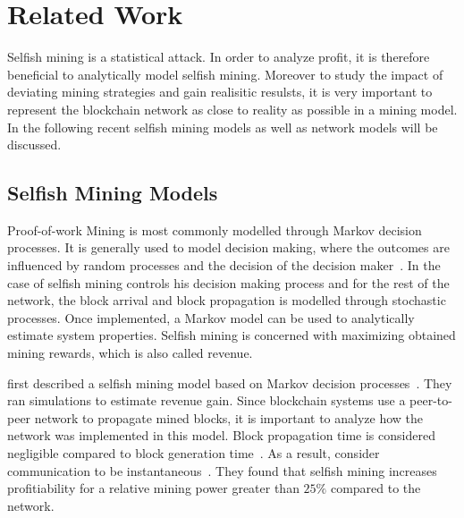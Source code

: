 \chapter{Related Work}\label{chap:relatedwork}
Selfish mining is a statistical attack. In order to analyze profit, it is therefore beneficial to analytically model selfish mining. Moreover to study the impact of deviating mining strategies and gain realisitic resulsts, it is very important to represent the blockchain network as close to reality as possible in a mining model. In the following recent selfish mining models as well as network models will be discussed.


\section{Selfish Mining Models}
Proof-of-work Mining is most commonly modelled through Markov decision processes.
It is generally used to model decision making, where the outcomes are influenced by random processes and the decision of the decision maker~\cite{ibe2013markov}.
In the case of selfish mining controls his decision making process and for the rest of the network, the block arrival and block propagation is modelled through stochastic processes. Once implemented, a Markov model can be used to analytically estimate system properties. Selfish mining is concerned with maximizing obtained mining rewards, which is also called revenue.

\citeauthor{eyal} first described a selfish mining model based on Markov decision processes~\cite{eyal}.
They ran simulations to estimate revenue gain. Since blockchain systems use a peer-to-peer network to propagate mined blocks, it is important to analyze how the network was implemented in this model. Block propagation time is considered negligible compared to block generation time~\cite{eyal}. As a result, \citeauthor{eyal} consider communication to be instantaneous~\citep{eyal}. They found that selfish mining increases profitiability for a relative mining power greater than $25\%$ compared to the network.

